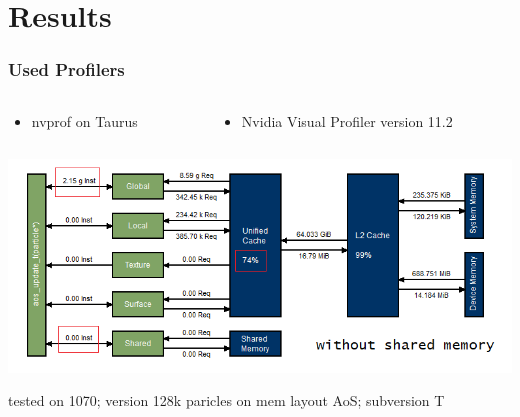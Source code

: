 \documentclass[aspectratio=169]{beamer}
\begin{document}
\section{Results}
\begin{frame}
	\frametitle{Used Profilers}
	\begin{columns}
	\begin{column}{0.3\textwidth}
		\begin{itemize}
			\item nvprof on Taurus
		\end{itemize}
	\end{column}
	
	\begin{column}{0.5\textwidth}
		\begin{itemize}
			\small \item Nvidia Visual Profiler version 11.2
		\end{itemize}
	\end{column}
	\end{columns}
	\bigskip
	\includegraphics[scale=0.50]{resources/128-1070-aos-update-t.png}
	
	\small tested on 1070; version 128k paricles on mem layout AoS; subversion T
\end{frame}
\end{document}
